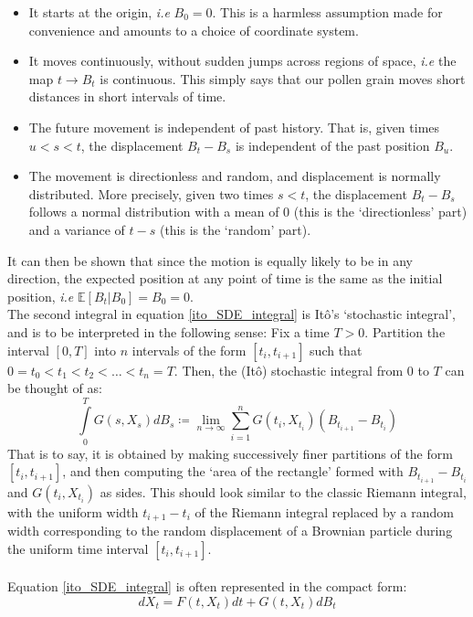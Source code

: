 \begin{itemize}
	\item It starts at the origin, \emph{i.e} $B_0 = 0$. This is a harmless assumption made for convenience and amounts to a choice of coordinate system.
	\item It moves continuously, without sudden jumps across regions of space, \emph{i.e} the map $t \to B_t$ is continuous. This simply says that our pollen grain moves short distances in short intervals of time.
	\item The future movement is independent of past history. That is, given times $u < s < t$, the displacement $B_t - B_s$ is independent of the past position $B_u$.
	\item The movement is directionless and random, and displacement is normally distributed. More precisely, given two times $s < t$, the displacement $B_t - B_s$ follows a normal distribution with a mean of $0$ (this is the `directionless' part) and a variance of $t-s$ (this is the `random' part).
\end{itemize}
It can then be shown that since the motion is equally likely to be in any direction, the expected position at any point of time is the same as the initial position, \emph{i.e} $\mathbb{E}[B_t | B_0] = B_0 = 0$.\\
The second integral in equation \eqref{ito_SDE_integral} is It\^o's `stochastic integral', and is to be interpreted in the following sense: Fix a time $T > 0$. Partition the interval $[0,T]$ into $n$ intervals of the form $[t_i,t_{i+1}]$ such that $0 = t_0 < t_1 < t_2 < \ldots < t_n = T$. Then, the (It\^o) stochastic integral from $0$ to $T$ can be thought of as:
\begin{equation*}
\int\limits_{0}^{T} G(s,X_s)dB_s \coloneqq \lim_{n \to \infty} \sum\limits_{i=1}^{n}G(t_i,X_{t_i})(B_{t_{i+1}}-B_{t_i})  
\end{equation*}
That is to say, it is obtained by making successively finer partitions of the form $[t_i,t_{i+1}]$, and then computing the `area of the rectangle' formed with $B_{t_{i+1}}-B_{t_i}$ and $G(t_i,X_{t_i})$ as sides. This should look similar to the classic Riemann integral, with the uniform width $t_{i+1}-t_i$ of the Riemann integral replaced by a random width corresponding to the random displacement of a Brownian particle during the uniform time interval $[t_i,t_{i+1}]$.\\
\\
Equation \eqref{ito_SDE_integral} is often represented in the compact form:
\begin{equation}
\label{ito_SDE_diff}
dX_t = F(t,X_t)dt + G(t,X_t)dB_t
\end{equation}
